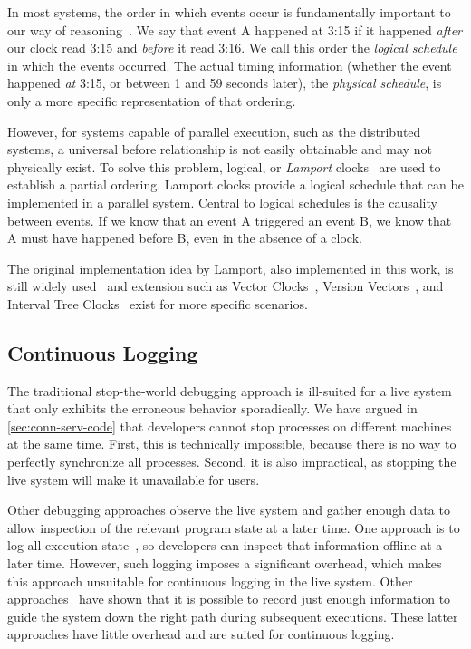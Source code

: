 In most systems, the order in which events occur is fundamentally
important to our way of reasoning~\cite{lamport1978time}. We say that
event A happened at 3:15 if it happened \emph{after} our clock read
3:15 and \emph{before} it read 3:16. We call this order the
\emph{logical schedule}~\cite{Konuru2000} in which the events
occurred. The actual timing information (whether the event happened
\emph{at} 3:15, or between 1 and 59 seconds later), the \emph{physical
  schedule}, is only a more specific representation of that ordering.

However, for systems capable of parallel execution, such as the
distributed systems, a universal before relationship is not easily
obtainable and may not physically exist. To solve this problem,
logical, or \emph{Lamport} clocks~\cite{lamport1978time} are used to
establish a partial ordering. Lamport clocks provide a logical
schedule that can be implemented in a parallel system. Central to
logical schedules is the causality between events. If we know that an
event A triggered an event B, we know that A must have happened before
B, even in the absence of a clock.

The original implementation idea by Lamport, also implemented in this
work, is still widely
used~\cite{Konuru2000,Stanley2009,Geels2006Replay,altekar2009odr} and
extension such as Vector Clocks~\cite{Mattern1988}, Version
Vectors~\cite{Parker1983}, and Interval Tree Clocks~\cite{Paulo} exist
for more specific scenarios.

\subsection{Continuous Logging}
\label{sec:continuous-logging}

The traditional stop-the-world debugging approach is ill-suited for a
live system that only exhibits the erroneous behavior sporadically. We
have argued in \autoref{sec:conn-serv-code} that developers cannot
stop processes on different machines at the same time. First, this is
technically impossible, because there is no way to perfectly
synchronize all processes. Second, it is also impractical, as stopping
the live system will make it unavailable for users.

Other debugging approaches observe the live system and gather enough
data to allow inspection of the relevant program state at a later
time. One approach is to log all execution state~\cite{Stanley2009},
so developers can inspect that information offline at a later
time. However, such logging imposes a significant overhead, which
makes this approach unsuitable for continuous logging in the live
system. Other approaches~\cite{Konuru2000,Geels2006Replay} have shown
that it is possible to record just enough information to guide the
system down the right path during subsequent executions. These latter
approaches have little overhead and are suited for continuous logging.

